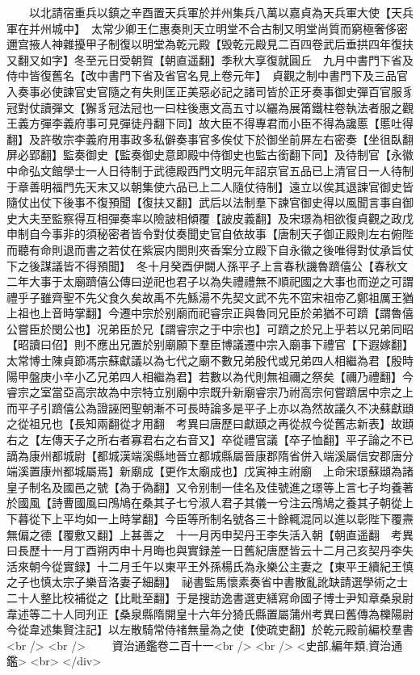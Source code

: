 　　以北請宿重兵以鎮之辛酉置天兵軍於并州集兵八萬以嘉貞為天兵軍大使【天兵軍在并州城中】　太常少卿王仁惠奏則天立明堂不合古制又明堂尚質而窮極奢侈密邇宫掖人神雜擾甲子制復以明堂為乾元殿【毁乾元殿見二百四卷武后垂拱四年復扶又翻又如字】冬至元日受朝賀【朝直遥翻】季秋大享復就圓丘　九月中書門下省及侍中皆復舊名【改中書門下省及省官名見上卷元年】　貞觀之制中書門下及三品官入奏事必使諫官史官隨之有失則匡正美惡必記之諸司皆於正牙奏事御史彈百官服豸冠對仗讀彈文【獬豸冠法冠也一曰柱後惠文高五寸以纚為展筩鐵柱卷執法者服之觀王義方彈李義府事可見彈徒丹翻下同】故大臣不得專君而小臣不得為讒慝【慝吐得翻】及許敬宗李義府用事政多私僻奏事官多俟仗下於御坐前屏左右密奏【坐徂臥翻屏必郢翻】監奏御史【監奏御史意即殿中侍御史也監古銜翻下同】及待制官【永徽中命弘文館學士一人日待制于武德殿西門文明元年詔京官五品已上清官日一人待制于章善明福門先天末又以朝集使六品已上二人隨仗待制】遠立以俟其退諫官御史皆隨仗出仗下後事不復預聞【復扶又翻】武后以法制羣下諫官御史得以風聞言事自御史大夫至監察得互相彈奏率以險詖相傾覆【詖皮義翻】及宋璟為相欲復貞觀之政戊申制自今事非的須秘密者皆令對仗奏聞史官自依故事【唐制天子御正殿則左右俯陛而聽有命則退而書之若仗在紫宸内閤則夾香案分立殿下自永徽之後唯得對仗承旨仗下之後謀議皆不得預聞】　冬十月癸酉伊闕人孫平子上言春秋譏魯躋僖公【春秋文二年大事于太廟躋僖公傳曰逆祀也君子以為失禮禮無不順祀國之大事也而逆之可謂禮乎子雖齊聖不先父食久矣故禹不先鯀湯不先契文武不先不窋宋祖帝乙鄭祖厲王猶上祖也上音時掌翻】今遷中宗於别廟而祀睿宗正與魯同兄臣於弟猶不可躋【謂魯僖公嘗臣於閔公也】况弟臣於兄【謂睿宗之于中宗也】可躋之於兄上乎若以兄弟同昭【昭讀曰佋】則不應出兄置於别廟願下羣臣博議遷中宗入廟事下禮官【下遐嫁翻】太常博士陳貞節馮宗蘇獻議以為七代之廟不數兄弟殷代或兄弟四人相繼為君【殷時陽甲盤庚小辛小乙兄弟四人相繼為君】若數以為代則無祖禰之祭矣【禰乃禮翻】今睿宗之室當亞高宗故為中宗特立别廟中宗既升新廟睿宗乃祔高宗何嘗躋居中宗之上而平子引躋僖公為證誣罔聖朝漸不可長時論多是平子上亦以為然故議久不决蘇獻頲之從祖兄也【長知兩翻從才用翻　考異曰唐歷曰獻頲之再從叔今從舊志新表】故頲右之【左傳天子之所右者寡君右之右音又】卒從禮官議【卒子恤翻】平子論之不已謫為康州都城尉【都城漢端溪縣地晉立都城縣屬晉康郡隋省併入端溪屬信安郡唐分端溪置康州都城屬焉】新廟成【更作太廟成也】戊寅神主祔廟　上命宋璟蘇頲為諸皇子制名及國邑之號【為于偽翻】又令别制一佳名及佳號進之璟等上言七子均養著於國風【詩曹國風曰鳲鳩在桑其子七兮淑人君子其儀一兮注云鳲鳩之養其子朝從上下暮從下上平均如一上時掌翻】今臣等所制名號各三十餘輒混同以進以彰陛下覆燾無偏之德【覆敷又翻】上甚善之　十一月丙申契丹王李失活入朝【朝直遥翻　考異曰長歷十一月丁酉朔丙申十月晦也與實録差一日舊紀唐歷皆云十二月己亥契丹李失活來朝今從實録】十二月壬午以東平王外孫楊氏為永樂公主妻之【東平王續紀王慎之子也慎太宗子樂音洛妻子細翻】　祕書監馬懷素奏省中書散亂訛缺請選學術之士二十人整比校補從之【比毗至翻】于是搜訪逸書選吏繕寫命國子博士尹知章桑泉尉韋述等二十人同刋正【桑泉縣隋開皇十六年分猗氏縣置屬蒲州考異曰舊傳為櫟陽尉今從韋述集賢注記】以左散騎常侍禇無量為之使【使疏吏翻】於乾元殿前編校羣書<br />
<br />
　　資治通鑑卷二百十一<br />
<br />
<史部,編年類,資治通鑑>  <br>
   </div> 

